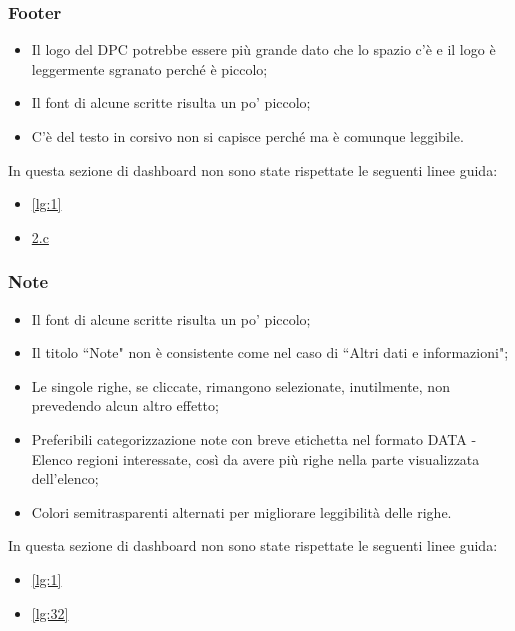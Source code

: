 \subsubsection{Footer}
\label{sss:footer}
\begin{itemize}
    \item Il logo del DPC potrebbe essere più grande dato che lo spazio c'è e il logo è leggermente sgranato perché è piccolo;
    \item Il font di alcune scritte risulta un po' piccolo;
    \item C'è del testo in corsivo non si capisce perché ma è comunque leggibile.
\end{itemize}
In questa sezione di dashboard non sono state rispettate le seguenti linee guida:
\begin{itemize}
    \item \ref{lg:1}
    \item \hyperref[lg:2.c]{2.c}
\end{itemize}

\subsubsection{Note}
\label{sss:note}
\begin{itemize}
    \item Il font di alcune scritte risulta un po' piccolo;
    \item Il titolo ``Note" non è consistente come nel caso di ``Altri dati e informazioni";
    \item Le singole righe, se cliccate, rimangono selezionate, inutilmente, non prevedendo alcun altro effetto;
    \item Preferibili categorizzazione note con breve etichetta nel formato DATA - Elenco regioni interessate, così da avere più righe nella parte visualizzata dell'elenco;
    \item Colori semitrasparenti alternati per migliorare leggibilità delle righe.
\end{itemize}
In questa sezione di dashboard non sono state rispettate le seguenti linee guida:
\begin{itemize}
    \item \ref{lg:1}
    \item \ref{lg:32}
\end{itemize}


